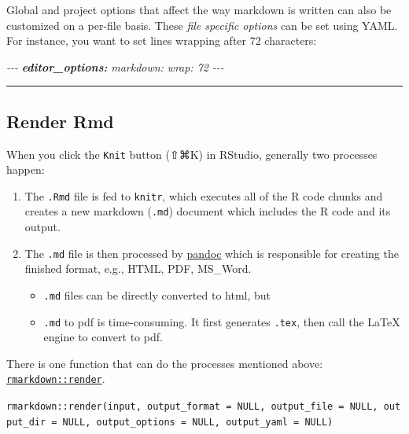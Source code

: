 \documentclass[
  a4paper,
  twoside,
  openright]{book}
\newenvironment{Shaded}{\begin{snugshade}}{\end{snugshade}}
\newcommand{\AnnotationTok}[1]{\textcolor[rgb]{0.56,0.35,0.01}{\textbf{\textit{#1}}}}
\newcommand{\CommentTok}[1]{\textcolor[rgb]{0.56,0.35,0.01}{\textit{#1}}}
\providecommand{\tightlist}{%
  \setlength{\itemsep}{0pt}\setlength{\parskip}{0pt}}
\theoremstyle{definition}
\theoremstyle{definition}
\theoremstyle{definition}
\theoremstyle{definition}
\theoremstyle{remark}
\begin{document}
Global and project options that affect the way markdown is written can also be customized on a per-file basis. These \emph{file specific options} can be set using YAML. For instance, you want to set lines wrapping after 72 characters:

\begin{Shaded}
\begin{Highlighting}[]
\CommentTok{{-}{-}{-}}
\AnnotationTok{editor\_options:}
\CommentTok{  markdown:}
\CommentTok{    wrap: 72}
\CommentTok{{-}{-}{-}}
\end{Highlighting}
\end{Shaded}

\begin{center}\rule{0.5\linewidth}{0.5pt}\end{center}

\subsection{Render Rmd}\label{render-rmd}

When you click the \texttt{Knit} button (⇧⌘K) in RStudio, generally two processes happen:

\begin{enumerate}
\def\labelenumi{\arabic{enumi}.}
\tightlist
\item
  The \texttt{.Rmd} file is fed to \texttt{knitr}, which executes all of the R code chunks and creates a new markdown (\texttt{.md}) document which includes the R code and its output.
\item
  The \texttt{.md} file is then processed by \href{http://pandoc.org/}{pandoc} which is responsible for creating the finished format, e.g., HTML, PDF, MS\_Word.

  \begin{itemize}
  \tightlist
  \item
    \texttt{.md} files can be directly converted to html, but
  \item
    \texttt{.md} to pdf is time-consuming. It first generates \texttt{.tex}, then call the LaTeX engine to convert to pdf.
  \end{itemize}
\end{enumerate}

There is one function that can do the processes mentioned above: \href{https://pkgs.rstudio.com/rmarkdown/reference/render.html}{\texttt{rmarkdown::render}}.

\texttt{rmarkdown::render(input,\ output\_format\ =\ NULL,\ output\_file\ =\ NULL,\ output\_dir\ =\ NULL,\ output\_options\ =\ NULL,\ output\_yaml\ =\ NULL)}
\end{document}
